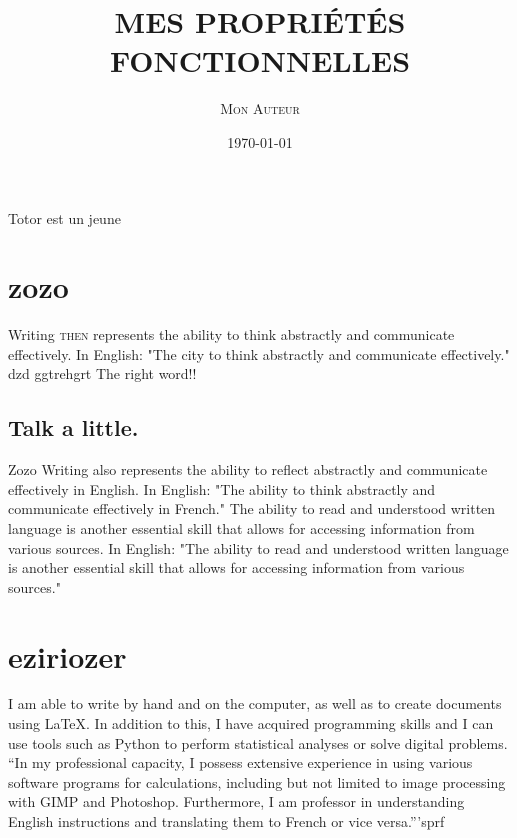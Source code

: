 \documentclass{article}
\title{\MakeUppercase{\textsc{Mes Propriétés Fonctionnelles}}}
\author{\textsc{Mon Auteur}}
\date{\today}
\begin{document}
\maketitle

Totor est un jeune

\section{zozo}

Writing \textsc{then} represents the ability to think abstractly and communicate effectively. In English: "The city to think abstractly and communicate effectively." dzd ggtrehgrt The right word!!

\subsection{Talk a little.}
Zozo Writing also represents the ability to reflect abstractly and communicate effectively in English. In English: "The ability to think abstractly and communicate effectively in French." The ability to read and understood written language is another essential skill that allows for accessing information from various sources. In English: "The ability to read and understood written language is another essential skill that allows for accessing information from various sources."


\section{eziriozer}

I am able to write by hand and on the computer, as well as to create documents using LaTeX. In addition to this, I have acquired programming skills and I can use tools such as Python to perform statistical analyses or solve digital problems. ``In my professional capacity, I possess extensive experience in using various software programs for calculations, including but not limited to image processing with GIMP and Photoshop. Furthermore, I am professor in understanding English instructions and translating them to French or vice versa.'''sprf
\end{document}
